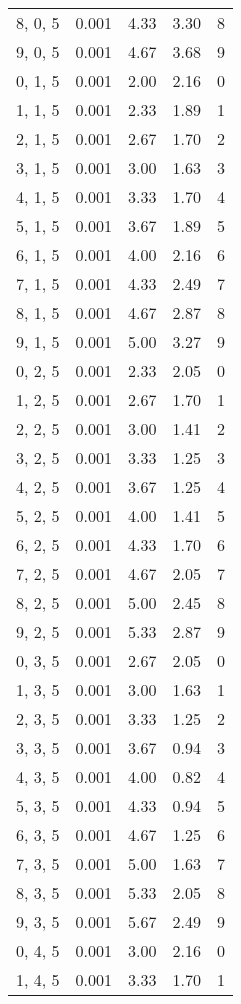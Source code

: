 \documentclass[12pt]{article}
\begin{document}
\begin{tabular}{c || c || c | c | c}
8, 0, 5 & 0.001 & 4.33 & 3.30 & 8 \\
9, 0, 5 & 0.001 & 4.67 & 3.68 & 9 \\
0, 1, 5 & 0.001 & 2.00 & 2.16 & 0 \\
1, 1, 5 & 0.001 & 2.33 & 1.89 & 1 \\
2, 1, 5 & 0.001 & 2.67 & 1.70 & 2 \\
3, 1, 5 & 0.001 & 3.00 & 1.63 & 3 \\
4, 1, 5 & 0.001 & 3.33 & 1.70 & 4 \\
5, 1, 5 & 0.001 & 3.67 & 1.89 & 5 \\
6, 1, 5 & 0.001 & 4.00 & 2.16 & 6 \\
7, 1, 5 & 0.001 & 4.33 & 2.49 & 7 \\
8, 1, 5 & 0.001 & 4.67 & 2.87 & 8 \\
9, 1, 5 & 0.001 & 5.00 & 3.27 & 9 \\
0, 2, 5 & 0.001 & 2.33 & 2.05 & 0 \\
1, 2, 5 & 0.001 & 2.67 & 1.70 & 1 \\
2, 2, 5 & 0.001 & 3.00 & 1.41 & 2 \\
3, 2, 5 & 0.001 & 3.33 & 1.25 & 3 \\
4, 2, 5 & 0.001 & 3.67 & 1.25 & 4 \\
5, 2, 5 & 0.001 & 4.00 & 1.41 & 5 \\
6, 2, 5 & 0.001 & 4.33 & 1.70 & 6 \\
7, 2, 5 & 0.001 & 4.67 & 2.05 & 7 \\
8, 2, 5 & 0.001 & 5.00 & 2.45 & 8 \\
9, 2, 5 & 0.001 & 5.33 & 2.87 & 9 \\
0, 3, 5 & 0.001 & 2.67 & 2.05 & 0 \\
1, 3, 5 & 0.001 & 3.00 & 1.63 & 1 \\
2, 3, 5 & 0.001 & 3.33 & 1.25 & 2 \\
3, 3, 5 & 0.001 & 3.67 & 0.94 & 3 \\
4, 3, 5 & 0.001 & 4.00 & 0.82 & 4 \\
5, 3, 5 & 0.001 & 4.33 & 0.94 & 5 \\
6, 3, 5 & 0.001 & 4.67 & 1.25 & 6 \\
7, 3, 5 & 0.001 & 5.00 & 1.63 & 7 \\
8, 3, 5 & 0.001 & 5.33 & 2.05 & 8 \\
9, 3, 5 & 0.001 & 5.67 & 2.49 & 9 \\
0, 4, 5 & 0.001 & 3.00 & 2.16 & 0 \\
1, 4, 5 & 0.001 & 3.33 & 1.70 & 1 \\

\end{tabular}
\end{document}
